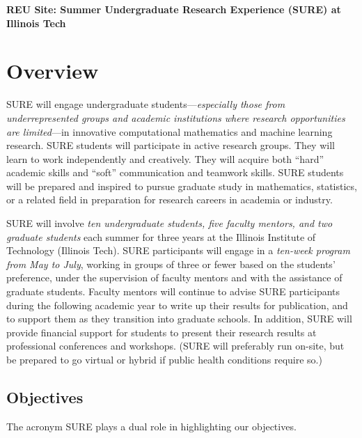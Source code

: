 \documentclass[11pt]{NSFamsart}
\begin{document}

\begin{center}
\Large 
\textbf{REU Site: Summer Undergraduate Research Experience (SURE) at Illinois Tech}
\end{center}



\section{Overview} 

SURE will engage undergraduate students---\emph{especially those from underrepresented groups and academic institutions where research opportunities are limited}---in innovative computational mathematics and machine learning research.  SURE students will participate in active research groups.  They will learn to work independently and creatively. They will acquire both ``hard'' academic skills and ``soft'' communication and teamwork skills.  SURE students will be prepared and inspired to pursue graduate study in mathematics, statistics, or a related field in preparation for research careers in academia or industry.

SURE will involve \emph{ten undergraduate students, five faculty mentors, and two graduate students} each summer for three years at the Illinois Institute of Technology (Illinois Tech).  SURE participants will engage in a \emph{ten-week program from May to July}, working in groups of three or fewer based on the students’ preference, under the supervision of faculty mentors and with the assistance of graduate students. Faculty mentors will continue to advise SURE participants during the following academic year to write up their results for publication, and to support them as they transition into graduate schools. In addition, SURE will provide financial support for students to present their research results at professional conferences and workshops.
(SURE will preferably run on-site, but be prepared to go virtual or hybrid if public health conditions require so.)

\subsection{Objectives} The acronym SURE plays a dual role in highlighting our objectives.
\end{document}
